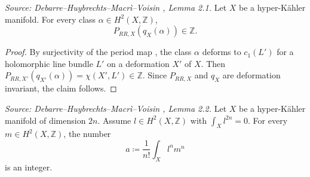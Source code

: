 \begin{lemma}
  \label{lem:hrr-integral}
  \textit{Source: Debarre--Huybrechts--Macr\`i--Voisin \cite{MR4654610}, Lemma 2.1.}
  Let \(X\) be a hyper-K\"ahler manifold.  For every class \(\alpha \in H^2(X, \mathbb{Z})\),
  \[
    P_{RR,X}(q_X(\alpha)) \in \mathbb{Z}.
  \]
\end{lemma}

\begin{proof}
  By surjectivity of the period map \cite[Proposition~25.12]{huy}, the class \(\alpha\)
  deforms to \(c_1(L')\) for a holomorphic line bundle \(L'\) on a deformation \(X'\)
  of \(X\).  Then \(P_{RR,X'}(q_{X'}(\alpha)) = \chi(X', L') \in \mathbb{Z}\).  Since
  \(P_{RR,X}\) and \(q_X\) are deformation invariant, the claim follows.
\end{proof}

\begin{lemma}
  \label{lem:a-is-integer}
  \textit{Source: Debarre--Huybrechts--Macr\`i--Voisin \cite{MR4654610}, Lemma 2.2.}
  Let \(X\) be a hyper-K\"ahler manifold of dimension \(2n\).  Assume
  \(l \in H^2(X, \mathbb{Z})\) with \(\int_X l^{2n} = 0\).  For every
  \(m \in H^2(X, \mathbb{Z})\), the number
  \[
    a \coloneqq \frac{1}{n!}\int_X l^n m^n
  \]
  is an integer.
\end{lemma}

